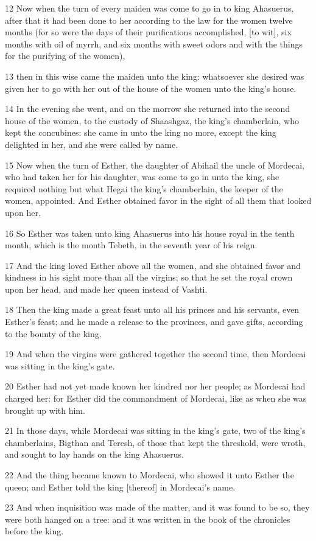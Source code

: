\par 12 Now when the turn of every maiden was come to go in to king Ahasuerus, after that it had been done to her according to the law for the women twelve months (for so were the days of their purifications accomplished, [to wit], six months with oil of myrrh, and six months with sweet odors and with the things for the purifying of the women),
\par 13 then in this wise came the maiden unto the king: whatsoever she desired was given her to go with her out of the house of the women unto the king's house.
\par 14 In the evening she went, and on the morrow she returned into the second house of the women, to the custody of Shaashgaz, the king's chamberlain, who kept the concubines: she came in unto the king no more, except the king delighted in her, and she were called by name.
\par 15 Now when the turn of Esther, the daughter of Abihail the uncle of Mordecai, who had taken her for his daughter, was come to go in unto the king, she required nothing but what Hegai the king's chamberlain, the keeper of the women, appointed. And Esther obtained favor in the sight of all them that looked upon her.
\par 16 So Esther was taken unto king Ahasuerus into his house royal in the tenth month, which is the month Tebeth, in the seventh year of his reign.
\par 17 And the king loved Esther above all the women, and she obtained favor and kindness in his sight more than all the virgins; so that he set the royal crown upon her head, and made her queen instead of Vashti.
\par 18 Then the king made a great feast unto all his princes and his servants, even Esther's feast; and he made a release to the provinces, and gave gifts, according to the bounty of the king.
\par 19 And when the virgins were gathered together the second time, then Mordecai was sitting in the king's gate.
\par 20 Esther had not yet made known her kindred nor her people; as Mordecai had charged her: for Esther did the commandment of Mordecai, like as when she was brought up with him.
\par 21 In those days, while Mordecai was sitting in the king's gate, two of the king's chamberlains, Bigthan and Teresh, of those that kept the threshold, were wroth, and sought to lay hands on the king Ahasuerus.
\par 22 And the thing became known to Mordecai, who showed it unto Esther the queen; and Esther told the king [thereof] in Mordecai's name.
\par 23 And when inquisition was made of the matter, and it was found to be so, they were both hanged on a tree: and it was written in the book of the chronicles before the king.

